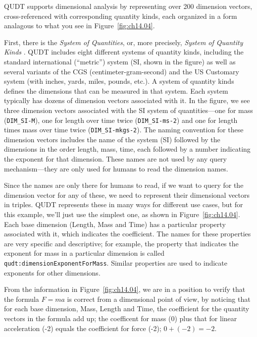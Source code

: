 QUDT supports dimensional analysis by representing over 200 dimension vectors,
cross-referenced with corresponding quantity kinds, each organized in a 
form analagous to what you see in Figure~\ref{fig:ch14.04}.

First, there is the \emph{System of Quantities}, or, more precisely, \emph{System of Quantity Kinds} . QUDT includes eight different
systems of quantity kinds, including the standard international (``metric'')
system (SI, shown in the figure) as well as several variants of the CGS
(centimeter-gram-second) and the US Customary system (with inches,
yards, miles, pounds, etc.). A system of quantity kinds defines the
dimensions that can be measured in that system. Each system typically
has dozens of dimension vectors associated with it. In the figure, we see three
dimension vectors associated with the SI system of quantities---one for mass
(\texttt{DIM\_SI-M}), one for length over time twice (\texttt{DIM\_SI-ms-2})
and one for length times mass over time twice (\texttt{DIM\_SI-mkgs-2}).
The naming convention for these dimension vectors includes the name of the
system (SI) followed by the dimensions in the order length, mass, time,
each followed by a number indicating the exponent for that dimension.
These names are not used by any query mechanism---they are only used for
humans to read the dimension names.

Since the names are only there for humans to read, if we want to query
for the dimension vector for any of these, we need to represent their
dimensional vectors in triples.  QUDT represents these in many ways for 
different use cases, but for this example, we'll just use the simplest 
one, as shown in Figure~\ref{fig:ch14.04}.  Each base dimension (Length, Mass and Time) has a particular
property associated with it, which indicates the coefficient.  The names for 
these properties are very specific and descriptive; for example, the property that indicates
the exponent for mass in a particular dimension is called \texttt{qudt:dimensionExponentForMass}. Similar properties 
are used to indicate exponents for other dimensions. 

From the information in Figure~\ref{fig:ch14.04}, 
we are in
a position to verify  that the formula $F = ma$ 
is correct from a dimensional point of view, by noticing that for each base 
dimension, Mass, Length and Time, 
the coefficient for the quantity vectors in the formula add up; the coefficent for mass (0) plus that for linear acceleration (-2)
equals the coefficient for force (-2); $0 + (-2) = -2$.

